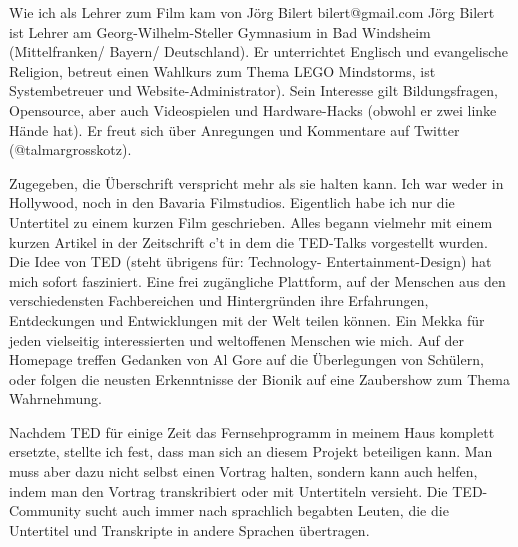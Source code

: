 Wie ich als Lehrer zum Film kam
von Jörg Bilert bilert@gmail.com
Jörg Bilert ist Lehrer am Georg-Wilhelm-Steller Gymnasium in Bad Windsheim (Mittelfranken/ Bayern/ Deutschland). Er unterrichtet Englisch und evangelische Religion, betreut einen Wahlkurs zum Thema LEGO Mindstorms, ist Systembetreuer und Website-Administrator). Sein Interesse gilt Bildungsfragen, Opensource, aber auch Videospielen und Hardware-Hacks (obwohl er zwei linke Hände hat). Er freut sich über Anregungen und Kommentare auf Twitter (@talmargrosskotz).


Zugegeben, die Überschrift verspricht mehr als sie halten kann. Ich war weder in Hollywood, noch in den Bavaria Filmstudios. Eigentlich habe ich nur die Untertitel zu einem kurzen Film geschrieben. Alles begann vielmehr mit einem kurzen Artikel in der Zeitschrift c’t in dem die TED-Talks vorgestellt wurden. Die Idee von TED (steht übrigens für: Technology- Entertainment-Design) hat mich sofort fasziniert. Eine frei zugängliche Plattform, auf der Menschen aus den verschiedensten Fachbereichen und Hintergründen ihre Erfahrungen, Entdeckungen und Entwicklungen mit der Welt teilen können. Ein Mekka für jeden vielseitig interessierten und weltoffenen Menschen wie mich. Auf der Homepage treffen Gedanken von Al Gore auf die Überlegungen von Schülern, oder folgen die neusten Erkenntnisse der Bionik auf eine Zaubershow zum Thema Wahrnehmung.


Nachdem TED für einige Zeit das Fernsehprogramm in meinem Haus komplett ersetzte, stellte ich fest, dass man sich an diesem Projekt beteiligen kann. Man muss aber dazu nicht selbst einen Vortrag halten, sondern kann auch helfen, indem man den Vortrag transkribiert oder mit Untertiteln versieht. Die TED-Community sucht auch immer nach sprachlich begabten Leuten, die die Untertitel und Transkripte in andere Sprachen übertragen.


